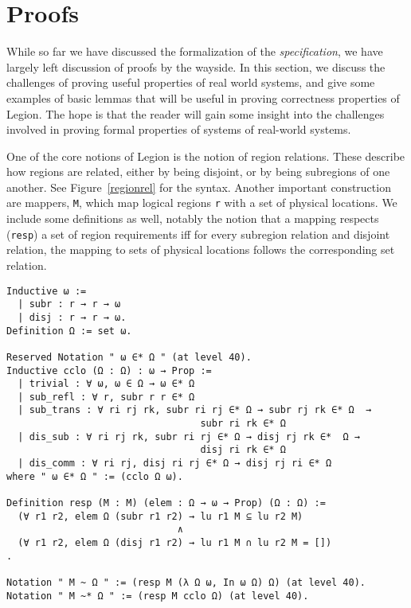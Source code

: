 \documentclass[sigconf]{acmart}
\begin{document}
\section{Proofs}

While so far we have discussed the formalization of the \emph{specification},
we have largely left discussion of proofs by the wayside. In this section, we
discuss the challenges of proving useful properties of real world systems, and
give some examples of basic lemmas that will be useful in proving correctness
properties of Legion. The hope is that the reader will gain some insight into
the challenges involved in proving formal properties of systems of real-world
systems.

One of the core notions of Legion is the notion of region relations. These
describe how regions are related, either by being disjoint, or by being
subregions of one another. See Figure~\ref{regionrel} for the syntax. Another
important construction are mappers, \texttt{M}, which map logical regions
\texttt{r} with a set of physical locations. We include some definitions as
well, notably the notion that a mapping respects (\texttt{resp}) a set of
region requirements iff for every subregion relation and disjoint relation, the
mapping to sets of physical locations follows the corresponding set relation.

\begin{figure*}
\centering
\begin{BVerbatim}
Inductive ω := 
  | subr : r → r → ω 
  | disj : r → r → ω.
Definition Ω := set ω.

Reserved Notation " ω ∈* Ω " (at level 40).
Inductive cclo (Ω : Ω) : ω → Prop := 
  | trivial : ∀ ω, ω ∈ Ω → ω ∈* Ω
  | sub_refl : ∀ r, subr r r ∈* Ω
  | sub_trans : ∀ ri rj rk, subr ri rj ∈* Ω → subr rj rk ∈* Ω  → 
                                  subr ri rk ∈* Ω 
  | dis_sub : ∀ ri rj rk, subr ri rj ∈* Ω → disj rj rk ∈*  Ω → 
                                  disj ri rk ∈* Ω
  | dis_comm : ∀ ri rj, disj ri rj ∈* Ω → disj rj ri ∈* Ω 
where " ω ∈* Ω " := (cclo Ω ω).

Definition resp (M : M) (elem : Ω → ω → Prop) (Ω : Ω) :=
  (∀ r1 r2, elem Ω (subr r1 r2) → lu r1 M ⊆ lu r2 M)
                              ∧ 
  (∀ r1 r2, elem Ω (disj r1 r2) → lu r1 M ∩ lu r2 M = [])
.

Notation " M ~ Ω " := (resp M (λ Ω ω, In ω Ω) Ω) (at level 40).
Notation " M ~* Ω " := (resp M cclo Ω) (at level 40).
\end{BVerbatim}
\caption{Syntax for region relations}
\label{regionrel}
\end{figure*}
\end{document}
